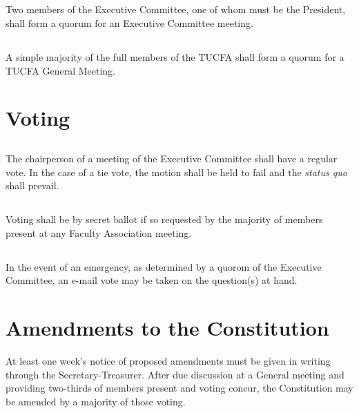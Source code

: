\documentclass[12pt]{article}
\begin{document}
\subsection{}
Two members of the Executive Committee, one of whom must be the President, shall form a quorum for an Executive Committee meeting.

\subsection{}
A simple majority of the full members of the TUCFA shall form a quorum for a TUCFA General Meeting.

\section{Voting}

\subsection{}
The chairperson of a meeting of the Executive Committee shall have a regular vote. In the case of a tie vote, the motion shall be held to fail and the \emph{status quo} shall prevail.

\subsection{}
Voting shall be by secret ballot if so requested by the majority of members present at any Faculty Association meeting.

\subsection{}
In the event of an emergency, as determined by a quorom of the Executive Committee, an e-mail vote may be taken on the question(s) at hand.

\section{Amendments to the Constitution}

At least one week's notice of proposed amendments must be given in writing through the Secretary-Treasurer. After due discussion at a General meeting and providing two-thirds of members present and voting concur, the Constitution may be amended by a majority of those voting.
\end{document}
